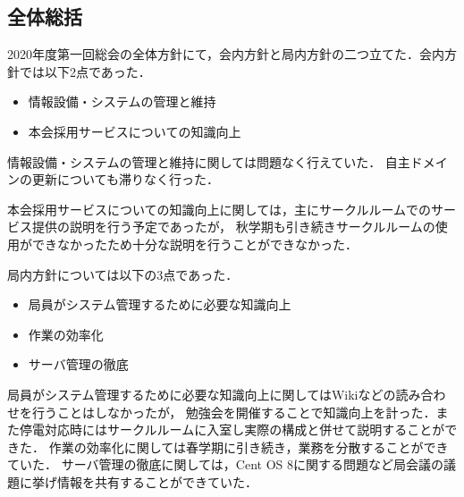 \subsection*{全体総括}


2020年度第一回総会の全体方針にて，会内方針と局内方針の二つ立てた．会内方針では以下2点であった．
\begin{itemize}
    \item 情報設備・システムの管理と維持
    \item 本会採用サービスについての知識向上
  \end{itemize}

情報設備・システムの管理と維持に関しては問題なく行えていた．
自主ドメインの更新についても滞りなく行った．

本会採用サービスについての知識向上に関しては，主にサークルルームでのサービス提供の説明を行う予定であったが，
秋学期も引き続きサークルルームの使用ができなかったため十分な説明を行うことができなかった．

局内方針については以下の3点であった．
\begin{itemize}
    \item 局員がシステム管理するために必要な知識向上
    \item 作業の効率化
    \item サーバ管理の徹底
\end{itemize}

局員がシステム管理するために必要な知識向上に関してはWikiなどの読み合わせを行うことはしなかったが，
勉強会を開催することで知識向上を計った．また停電対応時にはサークルルームに入室し実際の構成と併せて説明することができた．
作業の効率化に関しては春学期に引き続き，業務を分散することができていた．
サーバ管理の徹底に関しては，Cent OS 8に関する問題など局会議の議題に挙げ情報を共有することができていた．
